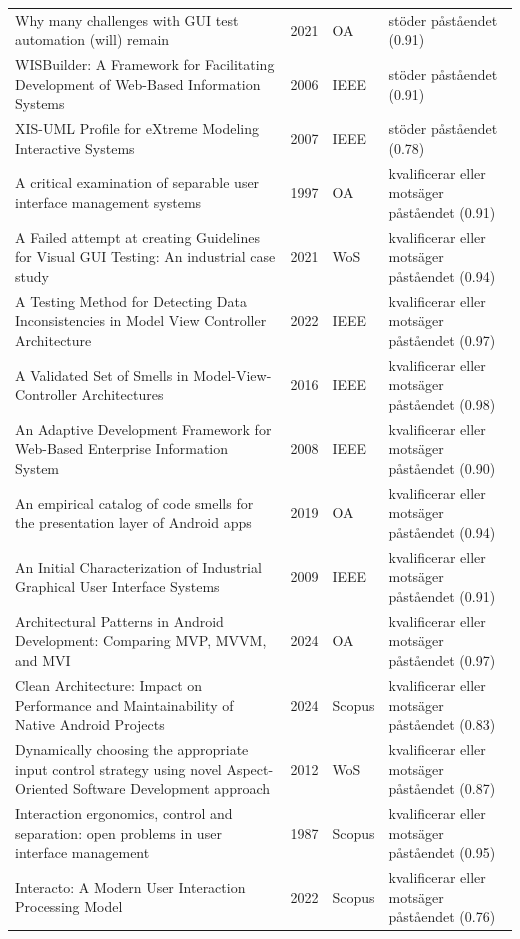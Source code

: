 \begin{longtable}{@{}%
  >{\raggedright\arraybackslash}p{}c%
  >{\raggedright\arraybackslash}p{}%
  >{\raggedright\arraybackslash}p{}@{}}
Why many challenges with GUI test automation (will) remain & 2021 & OA & stöder påståendet (0.91) \\
WISBuilder: A Framework for Facilitating Development of Web-Based Information Systems & 2006 & IEEE & stöder påståendet (0.91) \\
XIS-UML Profile for eXtreme Modeling Interactive Systems & 2007 & IEEE & stöder påståendet (0.78) \\
A critical examination of separable user interface management systems & 1997 & OA & kvalificerar eller motsäger påståendet (0.91) \\
A Failed attempt at creating Guidelines for Visual GUI Testing: An industrial case study & 2021 & WoS & kvalificerar eller motsäger påståendet (0.94) \\
A Testing Method for Detecting Data Inconsistencies in Model View Controller Architecture & 2022 & IEEE & kvalificerar eller motsäger påståendet (0.97) \\
A Validated Set of Smells in Model-View-Controller Architectures & 2016 & IEEE & kvalificerar eller motsäger påståendet (0.98) \\
An Adaptive Development Framework for Web-Based Enterprise Information System & 2008 & IEEE & kvalificerar eller motsäger påståendet (0.90) \\
An empirical catalog of code smells for the presentation layer of Android apps & 2019 & OA & kvalificerar eller motsäger påståendet (0.94) \\
An Initial Characterization of Industrial Graphical User Interface Systems & 2009 & IEEE & kvalificerar eller motsäger påståendet (0.91) \\
Architectural Patterns in Android Development: Comparing MVP, MVVM, and MVI & 2024 & OA & kvalificerar eller motsäger påståendet (0.97) \\
Clean Architecture: Impact on Performance and Maintainability of Native Android Projects & 2024 & Scopus & kvalificerar eller motsäger påståendet (0.83) \\
Dynamically choosing the appropriate input control strategy using novel Aspect-Oriented Software Development approach & 2012 & WoS & kvalificerar eller motsäger påståendet (0.87) \\
Interaction ergonomics, control and separation: open problems in user interface management & 1987 & Scopus & kvalificerar eller motsäger påståendet (0.95) \\
Interacto: A Modern User Interaction Processing Model & 2022 & Scopus & kvalificerar eller motsäger påståendet (0.76) \\

\end{longtable}
